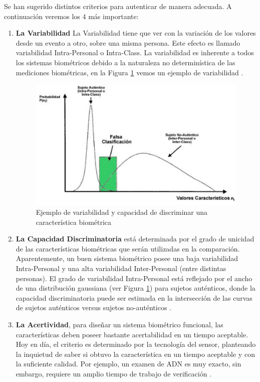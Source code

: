 Se han sugerido distintos criterios para autenticar de manera adecuada. A continuación veremos los 4 más importante:
\begin{enumerate}
\item \textbf{La Variabilidad} La Variabilidad tiene que ver con la variación de los valores desde un evento a otro, sobre una misma persona. Este efecto es llamado variabilidad Intra-Personal o Intra-Class. La variabilidad es inherente a todos los sistemas biométricos debido a la naturaleza no determinística de las mediciones biométricas, en la Figura \ref{la_variabilidad} vemos un ejemplo de variabilidad  \cite{Way00}.

\begin{figure}[H]
\centering
\includegraphics[scale=0.3]{images/capitulo2/la_variabilidad.png}
\caption{Ejemplo de variabilidad y capacidad de discriminar una característica biométrica}
\label{la_variabilidad}
\end{figure}


\item \textbf{La Capacidad Discriminatoria}  está determinada por el grado de unicidad de las características biométricas que serán utilizadas en la comparación. Aparentemente, un buen sistema biométrico posee una baja variabilidad Intra-Personal y una alta variabilidad Inter-Personal (entre distintas personas). El grado de variabilidad Intra-Personal está reflejado por el ancho de una distribución gaussiana (ver Figura \ref{la_variabilidad}) para sujetos auténticos, donde la capacidad discriminatoria puede ser estimada en la intersección de las curvas de sujetos auténticos versus sujetos no-auténticos \cite{Zha00}.

\item \textbf{La Acertividad}, para diseñar un sistema biométrico funcional, las características deben poseer bastante acertabilidad en un tiempo aceptable. Hoy en día, el criterio es determinado por la tecnología del sensor, planteando la inquietud de saber si obtuvo la característica en un tiempo aceptable y con la suficiente calidad. Por ejemplo, un examen de ADN es muy exacto, sin embargo, requiere un amplio tiempo de trabajo de verificación \cite{Zha00}.



\end{enumerate}
